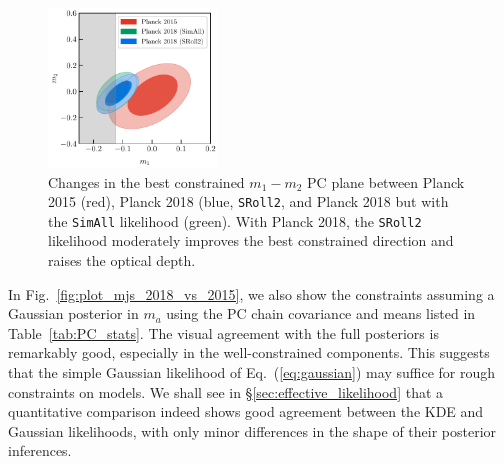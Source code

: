 \documentclass[prd,twocolumn,amsmath,amssymb,floatfix,superscriptaddress,nofootinbib]{revtex4-1}
\newcommand{\wh}[1]{\textcolor{blue}{#1}}
\begin{document}
\begin{figure}
\includegraphics[width=0.4\textwidth]{plots/plot_m1_m2_t18_r12_t19_t20_vs_pl18_pc_zmax30_pliklite_0930_vs_pl18_pc_zmax30_pliklite_srollv2_1015.pdf}
\caption{Changes in the best constrained $m_1-m_2$ PC plane between Planck 2015 (red), Planck 2018 (blue, \texttt{SRoll2}, and Planck 2018 but with the \texttt{SimAll} likelihood (green). With Planck 2018, the \texttt{SRoll2} likelihood moderately improves the best constrained direction and raises the optical depth.}
\label{fig:plot_m1m2_2015_vs_2018}
\end{figure}



In Fig.~\ref{fig:plot_mjs_2018_vs_2015}, we also show the constraints assuming a Gaussian posterior in $m_a$ using the PC chain covariance and means listed in Table~\ref{tab:PC_stats}.  The visual agreement with the full posteriors is remarkably good, especially in the well-constrained components.  This suggests that the simple Gaussian likelihood of Eq.~(\ref{eq:gaussian}) may suffice for rough constraints on models. We shall see in \S\ref{sec:effective_likelihood} that a quantitative comparison indeed shows good agreement between the KDE and Gaussian likelihoods, with only minor differences in the shape of their posterior inferences.


\end{document}
